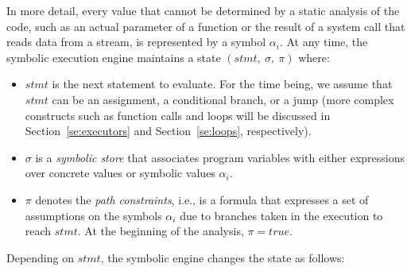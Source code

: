 In more detail, every value that cannot be determined by a static analysis of the code, such as an actual parameter of a function or the result of a system call that reads data from a stream, is represented by a symbol $\alpha_i$. At any time, the symbolic execution engine maintains a state $(stmt,~\sigma,~\pi)$ where:

\begin{itemize}

\item $stmt$ is the next statement to evaluate. For the time being, we assume that $stmt$ can be an assignment, a conditional branch, or a jump (more complex constructs such as function calls and loops will be discussed in  Section~\ref{se:executors} and Section~\ref{se:loops}, respectively).


\item $\sigma$ is a {\em symbolic store} that associates program variables with either expressions over concrete values or symbolic values $\alpha_i$.

\item $\pi$ denotes the {\em path constraints}, i.e., is a formula that expresses a set of assumptions on the symbols $\alpha_i$ due to branches taken in the execution to reach $stmt$. At the beginning of the analysis, $\pi=true$.

\end{itemize}

\noindent Depending on $stmt$, the symbolic engine changes the state as follows:


